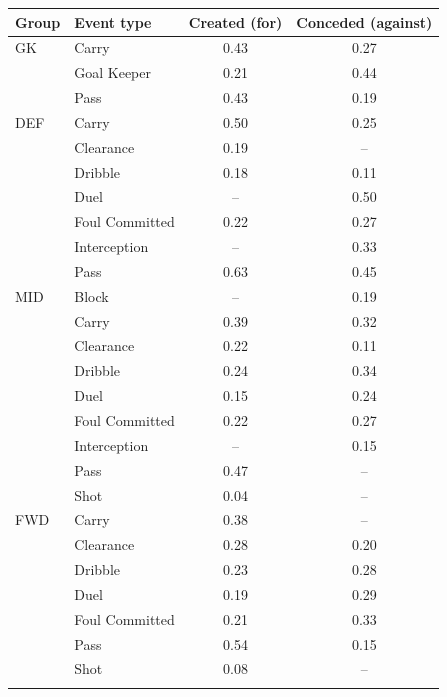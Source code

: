 \begin{tabular}{llcc}
\toprule
Group & Event type & Created (for) & Conceded (against) \\
\midrule
GK & Carry & 0.43 & 0.27 \\
 & Goal Keeper & 0.21 & 0.44 \\
 & Pass & 0.43 & 0.19 \\
\addlinespace
DEF & Carry & 0.50 & 0.25 \\
 & Clearance & 0.19 & -- \\
 & Dribble & 0.18 & 0.11 \\
 & Duel & -- & 0.50 \\
 & Foul Committed & 0.22 & 0.27 \\
 & Interception & -- & 0.33 \\
 & Pass & 0.63 & 0.45 \\
\addlinespace
MID & Block & -- & 0.19 \\
 & Carry & 0.39 & 0.32 \\
 & Clearance & 0.22 & 0.11 \\
 & Dribble & 0.24 & 0.34 \\
 & Duel & 0.15 & 0.24 \\
 & Foul Committed & 0.22 & 0.27 \\
 & Interception & -- & 0.15 \\
 & Pass & 0.47 & -- \\
 & Shot & 0.04 & -- \\
\addlinespace
FWD & Carry & 0.38 & -- \\
 & Clearance & 0.28 & 0.20 \\
 & Dribble & 0.23 & 0.28 \\
 & Duel & 0.19 & 0.29 \\
 & Foul Committed & 0.21 & 0.33 \\
 & Pass & 0.54 & 0.15 \\
 & Shot & 0.08 & -- \\
\addlinespace
\bottomrule
\end{tabular}
